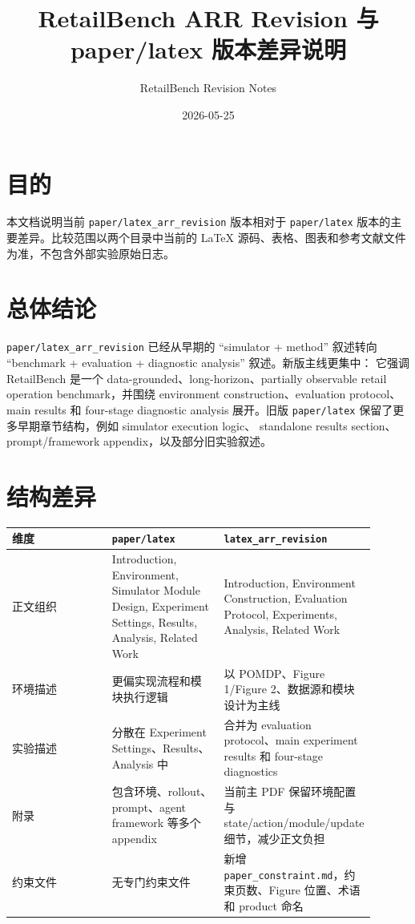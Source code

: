 \documentclass[11pt,fontset=none]{ctexart}
\title{RetailBench ARR Revision 与 paper/latex 版本差异说明}
\author{RetailBench Revision Notes}
\date{2026-05-25}
\begin{document}
\maketitle

\section{目的}

本文档说明当前 \texttt{paper/latex\_arr\_revision} 版本相对于
\texttt{paper/latex} 版本的主要差异。比较范围以两个目录中当前的 LaTeX
源码、表格、图表和参考文献文件为准，不包含外部实验原始日志。

\section{总体结论}

\texttt{paper/latex\_arr\_revision} 已经从早期的 ``simulator + method''
叙述转向 ``benchmark + evaluation + diagnostic analysis'' 叙述。新版主线更集中：
它强调 RetailBench 是一个 data-grounded、long-horizon、partially observable
retail operation benchmark，并围绕 environment construction、evaluation
protocol、main results 和 four-stage diagnostic analysis 展开。旧版
\texttt{paper/latex} 保留了更多早期章节结构，例如 simulator execution logic、
standalone results section、prompt/framework appendix，以及部分旧实验叙述。

\section{结构差异}

\begin{table}[h]
\centering
\small
\begin{tabular}{p{0.28\linewidth}p{0.31\linewidth}p{0.31\linewidth}}
\toprule
维度 & \texttt{paper/latex} & \texttt{latex\_arr\_revision} \\
\midrule
正文组织 & Introduction, Environment, Simulator Module Design, Experiment Settings, Results, Analysis, Related Work & Introduction, Environment Construction, Evaluation Protocol, Experiments, Analysis, Related Work \\
环境描述 & 更偏实现流程和模块执行逻辑 & 以 POMDP、Figure 1/Figure 2、数据源和模块设计为主线 \\
实验描述 & 分散在 Experiment Settings、Results、Analysis 中 & 合并为 evaluation protocol、main experiment results 和 four-stage diagnostics \\
附录 & 包含环境、rollout、prompt、agent framework 等多个 appendix & 当前主 PDF 保留环境配置与 state/action/module/update 细节，减少正文负担 \\
约束文件 & 无专门约束文件 & 新增 \texttt{paper\_constraint.md}，约束页数、Figure 位置、术语和 product 命名 \\
\bottomrule
\end{tabular}
\end{table}
\end{document}
